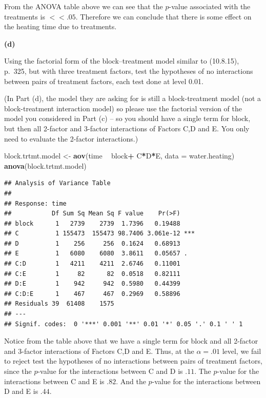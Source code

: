 \documentclass[12pt,]{article}
\newenvironment{Shaded}{\begin{snugshade}}{\end{snugshade}}
\newcommand{\KeywordTok}[1]{\textcolor[rgb]{0.13,0.29,0.53}{\textbf{#1}}}
\newcommand{\DataTypeTok}[1]{\textcolor[rgb]{0.13,0.29,0.53}{#1}}
\newcommand{\StringTok}[1]{\textcolor[rgb]{0.31,0.60,0.02}{#1}}
\newcommand{\OperatorTok}[1]{\textcolor[rgb]{0.81,0.36,0.00}{\textbf{#1}}}
\newcommand{\NormalTok}[1]{#1}
\begin{document}
From the ANOVA table above we can see that the \(p\)-value associated
with the treatments is \(<< .05\). Therefore we can conclude that there
is some effect on the heating time due to treatments.

\textbf{(d)}

Using the factorial form of the block--treatment model similar to
(10.8.15), p.~325, but with three treatment factors, test the hypotheses
of no interactions between pairs of treatment factors, each test done at
level 0.01.

(In Part (d), the model they are asking for is still a block-treatment
model (not a block-treatment interaction model) so please use the
factorial version of the model you considered in Part (c) -- so you
should have a single term for block, but then all 2-factor and 3-factor
interactions of Factors C,D and E. You only need to evaluate the
2-factor interactions.)

\begin{Shaded}
\begin{Highlighting}[]
\NormalTok{block.trtmt.model <-}\StringTok{ }\KeywordTok{aov}\NormalTok{(time }\OperatorTok{~}\StringTok{ }\NormalTok{block}\OperatorTok{+}\StringTok{ }\NormalTok{C}\OperatorTok{*}\NormalTok{D}\OperatorTok{*}\NormalTok{E, }\DataTypeTok{data =}\NormalTok{ water.heating)}
\KeywordTok{anova}\NormalTok{(block.trtmt.model)}
\end{Highlighting}
\end{Shaded}

\begin{verbatim}
## Analysis of Variance Table
## 
## Response: time
##           Df Sum Sq Mean Sq F value    Pr(>F)    
## block      1   2739    2739  1.7396   0.19488    
## C          1 155473  155473 98.7406 3.061e-12 ***
## D          1    256     256  0.1624   0.68913    
## E          1   6080    6080  3.8611   0.05657 .  
## C:D        1   4211    4211  2.6746   0.11001    
## C:E        1     82      82  0.0518   0.82111    
## D:E        1    942     942  0.5980   0.44399    
## C:D:E      1    467     467  0.2969   0.58896    
## Residuals 39  61408    1575                      
## ---
## Signif. codes:  0 '***' 0.001 '**' 0.01 '*' 0.05 '.' 0.1 ' ' 1
\end{verbatim}

Notice from the table above that we have a single term for block and all
2-factor and 3-factor interactions of Factors C,D and E. Thus, at the
\(\alpha = .01\) level, we fail to reject test the hypotheses of no
interactions between pairs of treatment factors, since the \(p\)-value
for the interactions between C and D is \(.11\). The \(p\)-value for the
interactions between C and E is \(.82\). And the \(p\)-value for the
interactions between D and E is \(.44\).
\end{document}
